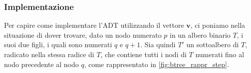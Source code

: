 \subsubsection{Implementazione}
Per capire come implementare l'ADT utilizzando il vettore $\mathbf{v}$, ci poniamo
nella situazione di dover trovare, dato un nodo numerato $p$ in un albero 
binario $T$, i suoi due figli, i quali sono numerati $q$ e $q+1$. 
Sia quindi $T'$ un sottoalbero di $T$, radicato nella stessa radice di $T$, 
che contiene tutti i nodi di $T$ numerati fino al nodo precedente 
al nodo $q$, come rappresentato in \cref{fig:btree_rappr_step}. 


\begin{figure}[h]
	\centering




	\begin{tikzpicture}[x=0.75pt,y=0.75pt,yscale=-1,xscale=1]


\end{tikzpicture}
\end{figure}
